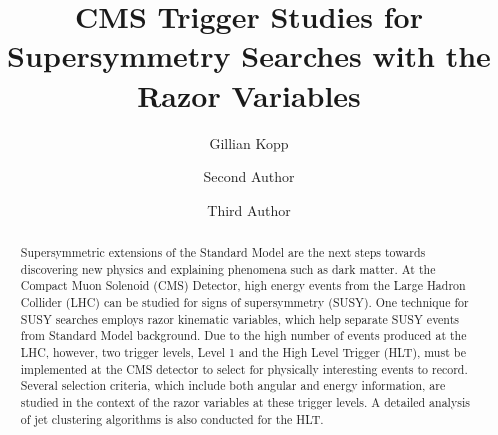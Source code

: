 \documentclass[twocolumn,aps,prd,reprint]{revtex4-1}
\begin{document}
\graphicspath{{GillianKopp/}}

\title{CMS Trigger Studies for Supersymmetry Searches with the Razor Variables}
\author{Gillian Kopp}
\author{Second Author}
\author{Third Author}

\begin{abstract}
Supersymmetric extensions of the Standard Model are the next steps towards discovering new physics and explaining phenomena such as dark matter. At the Compact Muon Solenoid (CMS) Detector, high energy events from the Large Hadron Collider (LHC) can be studied for signs of supersymmetry (SUSY). One technique for SUSY searches employs razor kinematic variables, which help separate SUSY events from Standard Model background. Due to the high number of events produced at the LHC, however, two trigger levels, Level 1 and the High Level Trigger (HLT), must be implemented at the CMS detector to select for physically interesting events to record. Several selection criteria, which include both angular and energy information, are studied in the context of the razor variables at these trigger levels. A detailed analysis of jet clustering algorithms is also conducted for the HLT.
\end{abstract}
\maketitle
\end{document}
